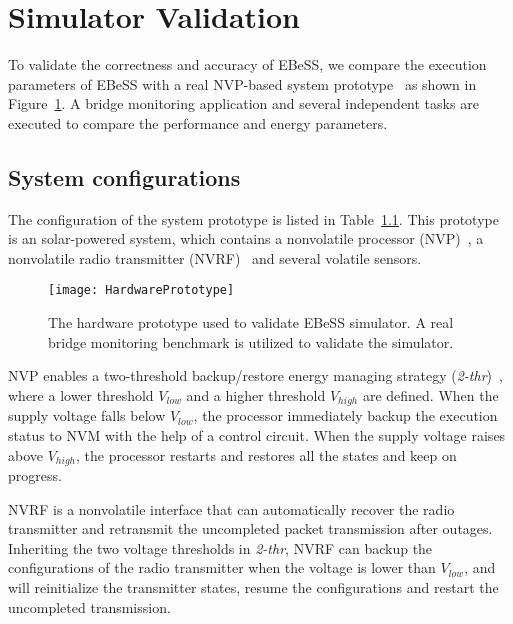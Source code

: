 \section{Simulator Validation}	\label{sec:valid}
%
To validate the correctness and accuracy of EBeSS, we compare the execution parameters of EBeSS with a real NVP-based system prototype~\cite{wang2017a130nm} as shown in Figure~\ref{fig:HardwarePrototype}.
A bridge monitoring application and several independent tasks are executed to compare the performance and energy parameters.

\subsection{System configurations}
The configuration of the system prototype is listed in Table~\ref{}. 
This prototype is an solar-powered system, which contains a nonvolatile processor (NVP)~\cite{wang20123us,Liu2015Ambient}, a nonvolatile radio transmitter (NVRF)~\cite{wang2017a130nm} and several volatile sensors.

\begin{figure}[!htpb]
	\centering
	\vspace{-5pt}
	\texttt{[image: HardwarePrototype]}
	\vspace{-5pt}
	\caption{The hardware prototype used to validate EBeSS simulator. A real bridge monitoring benchmark is utilized to validate the simulator.}	\label{fig:HardwarePrototype}
\end{figure}

NVP enables a two-threshold backup/restore energy managing strategy (\emph{2-thr})~\cite{wang20123us,gu2016nvpsim}, where a lower threshold $V_{low}$ and a higher threshold $V_{high}$ are defined.
When the supply voltage falls below $V_{low}$, the processor immediately backup the execution status to NVM with the help of a control circuit.
When the supply voltage raises above $V_{high}$, the processor restarts and restores all the states and keep on progress.

NVRF is a nonvolatile interface that can automatically recover the radio transmitter and retransmit the uncompleted packet transmission after outages.
Inheriting the two voltage thresholds in \emph{2-thr}, NVRF can backup the configurations of the radio transmitter when the voltage is lower than $V_{low}$, and will reinitialize the transmitter states, resume the configurations and restart the uncompleted transmission.

